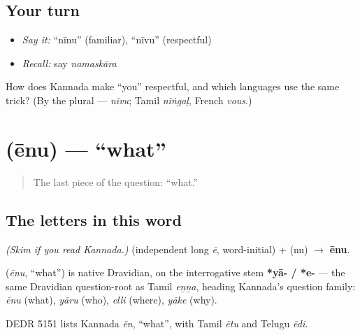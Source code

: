 \subsection*{Your turn}
\begin{itemize}
\raggedright
  \item \emph{Say it:} \textquotedblleft{}nīnu\textquotedblright{} (familiar), \textquotedblleft{}nīvu\textquotedblright{} (respectful)
  \item \emph{Recall:} say \emph{namaskāra}
\end{itemize}

\begin{tcolorbox}[breakable,colback=teal!4,colframe=teal!35!black,title={Before you move on}]
How does Kannada make \textquotedblleft{}you\textquotedblright{} respectful, and which languages use the same trick? (By the plural — \emph{nīvu}; Tamil \emph{nīṅgaḷ}, French \emph{vous}.)
\end{tcolorbox}
\section[\texorpdfstring{\kn{ಏನು} (ēnu)}{ಏನು (ēnu)}]{ (ēnu) — \textquotedblleft{}what\textquotedblright{}}

\label{lesson:KA-C02-enu}



\begin{quote}
The last piece of the question: \textquotedblleft{}what.\textquotedblright{}
\end{quote}

\subsection*{The letters in this word}
\emph{(Skim if you read Kannada.)} \textbf{} (independent long \emph{ē}, word-initial) + \textbf{} (nu) $\to$ \textbf{ēnu}.

\begin{cousinweb}
\textbf{} (\emph{ēnu}, \textquotedblleft{}what\textquotedblright{}) is native Dravidian, on the interrogative stem \textbf{*yā- / *e-} — the same Dravidian question-root as Tamil \emph{eṉṉa}, heading Kannada's question family: \emph{ēnu} (what), \emph{yāru} (who), \emph{elli} (where), \emph{yāke} (why).

DEDR 5151 lists Kannada \emph{ēn}, \textquotedblleft{}what\textquotedblright{}, with Tamil \emph{ētu} and Telugu \emph{ēdi}.
\end{cousinweb}

